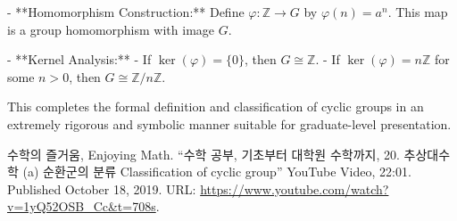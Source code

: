 \documentclass[11pt,openany]{article}
\begin{document}
- **Homomorphism Construction:**  
Define \(\varphi: \mathbb{Z} \to G\) by \(\varphi(n) = a^n\). This map is a group homomorphism with image \(G\).

- **Kernel Analysis:**
- If \(\ker(\varphi) = \{0\}\), then \(G \cong \mathbb{Z}\).
- If \(\ker(\varphi) = n\mathbb{Z}\) for some \(n > 0\), then \(G \cong \mathbb{Z}/n\mathbb{Z}\).

This completes the formal definition and classification of cyclic groups in an extremely rigorous and symbolic manner suitable for graduate-level presentation.

\newpage
{}

\vfill
\begin{thebibliography}{9}
	수학의 즐거움, Enjoying Math. ``수학 공부, 기초부터 대학원 수학까지, 20. 추상대수학 (a) 순환군의 분류 Classification of cyclic group'' YouTube Video, 22:01. Published 
	October 18, 2019. URL: \url{https://www.youtube.com/watch?v=1yQ52OSB_Cc&t=708s}.
\end{thebibliography}

\appendix
\end{document}
